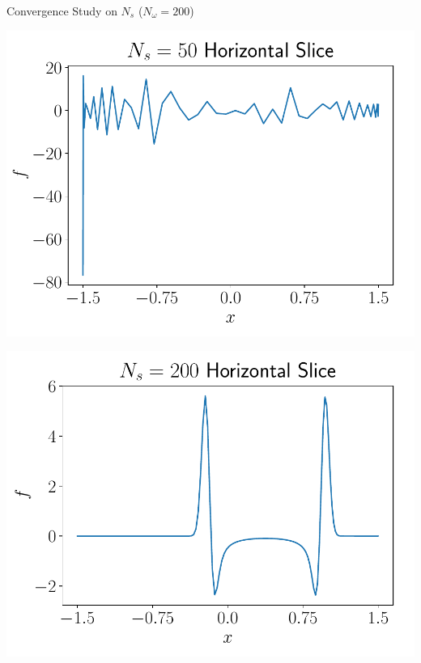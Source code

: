 \documentclass{beamer}
\begin{document}
\begin{frame}{Convergence Study on $N_s$ \quad ($N_\omega = 200$)}
{\begin{minipage}{0.38\linewidth}
		\includegraphics[width=\linewidth]{figures/Physical_Solution_Nonsymmetric_50_slice_Ns.pdf} 
	\end{minipage}
	\hspace{-0.25cm}
	\begin{minipage}{0.38\linewidth}
		\includegraphics[width=\linewidth]{figures/Physical_Solution_Nonsymmetric_200_slice_Ns.pdf} 
	\end{minipage}
	}
\end{frame}
\end{document}
